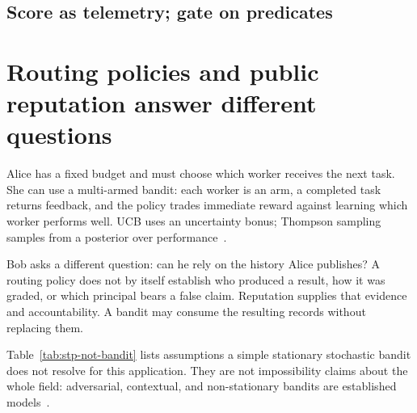 \documentclass[11pt,a4paper]{article}
\theoremstyle{definition}
\begin{document}
\subsection{Score as telemetry; gate on predicates}


\pdexercisepointer{\ref{ex:stp-bt-vs-elo-regime}}{\ref{ex:stp-rotten-substrate}}{\pageref{ex:stp-bt-vs-elo-regime}}

\section{Routing policies and public reputation answer different questions}\label{sec:not-bandit}

Alice has a fixed budget and must choose which worker receives the next task. She can use a multi-armed bandit: each worker is an arm, a completed task returns feedback, and the policy trades immediate reward against learning which worker performs well. UCB uses an uncertainty bonus; Thompson sampling samples from a posterior over performance~.

Bob asks a different question: can he rely on the history Alice publishes? A routing policy does not by itself establish who produced a result, how it was graded, or which principal bears a false claim. Reputation supplies that evidence and accountability. A bandit may consume the resulting records without replacing them.


Table~\ref{tab:stp-not-bandit} lists assumptions a simple stationary stochastic bandit does not resolve for this application. They are not impossibility claims about the whole field: adversarial, contextual, and non-stationary bandits are established models~.
\end{document}
